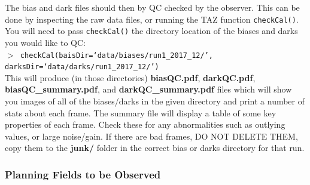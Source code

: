 \documentclass[12pt]{article}
\begin{document}
The bias and dark files should then by QC checked by the observer. This can be done by inspecting the raw data files, or running the TAZ function \texttt{checkCal()}. You will need to pass \texttt{checkCal()} the directory location of the biases and darks you would like to QC:\\

 \texttt{$>$ checkCal(baisDir=`data/biases/run1\_2017\_12/', \\ darksDir=`data/darks/run1\_2017\_12/')} \\
 
This will produce (in those directories) \textbf{biasQC.pdf}, \textbf{darkQC.pdf}, \textbf{biasQC\_summary.pdf}, and \textbf{darkQC\_summary.pdf} files  which will show you images of all of the biases/darks in the given directory and print a number of stats about each frame. The summary file will display a table of some key properties of each frame. Check these for any abnormalities such as outlying values, or large noise/gain. If there are bad frames, DO NOT DELETE THEM,  copy them to the \textbf{junk/} folder in the correct bias or darks directory for that run. \\

\begin{center}
\end{center}


\subsubsection{Planning Fields to be Observed}
\end{document}
